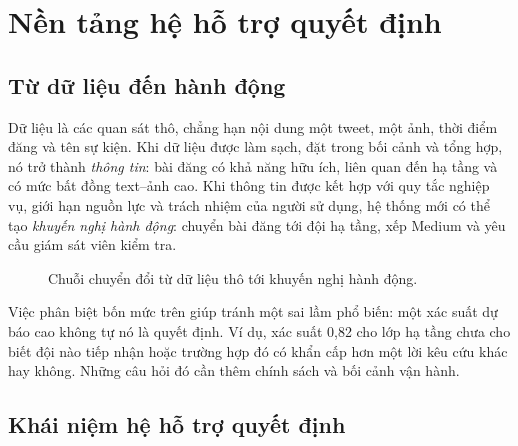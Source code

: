 \chapter{Nền tảng hệ hỗ trợ quyết định}

\section{Từ dữ liệu đến hành động}

Dữ liệu là các quan sát thô, chẳng hạn nội dung một tweet, một ảnh, thời điểm
đăng và tên sự kiện. Khi dữ liệu được làm sạch, đặt trong bối cảnh và tổng hợp,
nó trở thành \emph{thông tin}: bài đăng có khả năng hữu ích, liên quan đến hạ
tầng và có mức bất đồng text--ảnh cao. Khi thông tin được kết hợp với quy tắc
nghiệp vụ, giới hạn nguồn lực và trách nhiệm của người sử dụng, hệ thống mới
có thể tạo \emph{khuyến nghị hành động}: chuyển bài đăng tới đội hạ tầng,
xếp Medium và yêu cầu giám sát viên kiểm tra.

\begin{figure}[H]
\centering
{}
\caption{Chuỗi chuyển đổi từ dữ liệu thô tới khuyến nghị hành động.}
\end{figure}

Việc phân biệt bốn mức trên giúp tránh một sai lầm phổ biến: một xác suất dự
báo cao không tự nó là quyết định. Ví dụ, xác suất 0,82 cho lớp hạ tầng chưa
cho biết đội nào tiếp nhận hoặc trường hợp đó có khẩn cấp hơn một lời kêu cứu
khác hay không. Những câu hỏi đó cần thêm chính sách và bối cảnh vận hành.

\section{Khái niệm hệ hỗ trợ quyết định}

